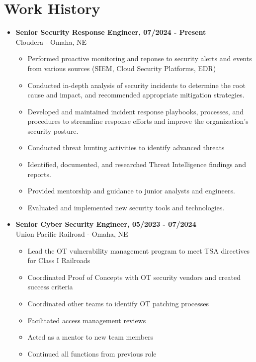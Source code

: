 \documentclass[a4paper,10pt]{article}
\begin{document}
\section*{Work History}
\begin{itemize}
    \item\textbf{Senior Security Response Engineer, 07/2024 - Present} \\
    Cloudera - Omaha, NE
    \begin{itemize}
        \small
        \leftskip=4em
        \item Performed proactive monitoring and reponse to security alerts and events from various sources (SIEM, Cloud Security Platforms, EDR)
        \item Conducted in-depth analysis of security incidents to determine the root cause and impact, and recommended appropriate mitigation strategies.
        \item Developed and maintained incident response playbooks, processes, and procedures to streamline response efforts and improve the organization's security posture.
        \item Conducted threat hunting activities to identify advanced threats
        \item Identified, documented, and researched Threat Intelligence findings and reports.
        \item Provided mentorship and guidance to junior analysts and engineers.
        \item Evaluated and implemented new security tools and technologies.
    \end{itemize}
    \item\textbf{Senior Cyber Security Engineer, 05/2023 - 07/2024} \\
    Union Pacific Railroad - Omaha, NE
    \begin{itemize}
        \small
        \leftskip=4em
        \item Lead the OT vulnerability management program to meet TSA directives for Class I Railroads
        \item Coordinated Proof of Concepts with OT security vendors and created success criteria
        \item Coordinated other teams to identify OT patching processes
        \item Facilitated access management reviews
        \item Acted as a mentor to new team members
        \item Continued all functions from previous role

\end{itemize}
\end{itemize}
\end{document}
